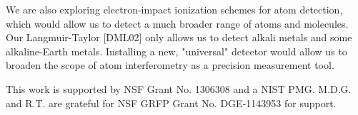 \documentclass[twocolumn, prl,showpacs,superscriptaddress]{revtex4-1}   %
\begin{document}
We are also exploring electron-impact ionization schemes for atom detection, which would allow us to detect a much broader range of atoms and molecules. Our Langmuir-Taylor [DML02] only allows us to detect alkali metals and some alkaline-Earth metals. Installing a new, "universal" detector would allow us to broaden the scope of atom interferometry as a precision measurement tool. 

This work is supported by NSF Grant No. 1306308 and a NIST PMG. M.D.G. and R.T. are grateful for NSF GRFP Grant No. DGE-1143953 for support. 



\end{document}

